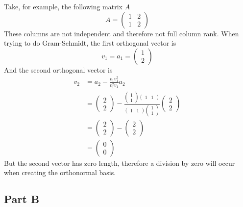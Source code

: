 \documentclass{article}
\begin{document}
Take, for example, the following matrix $A$
$$ A = \begin{pmatrix}
    1 & 2 \\
    1 & 2
\end{pmatrix} $$
These columns are not independent and therefore not full column rank. When
trying to do Gram-Schmidt, the first orthogonal vector is
$$ v_1 = a_1 = \begin{pmatrix} 1 \\ 2 \end{pmatrix} $$
And the second orthogonal vector is
\begin{align*}
    v_2 &= a_2 - \frac{v_1 v_1^2}{v_1^2 v_1} a_2 \\
    &= \begin{pmatrix} 2 \\ 2 \end{pmatrix} - \frac{\begin{pmatrix} 1 \\ 1
    \end{pmatrix} \begin{pmatrix} 1 & 1 \end{pmatrix}}{\begin{pmatrix} 1 & 1
    \end{pmatrix} \begin{pmatrix} 1 \\ 1 \end{pmatrix}} \begin{pmatrix} 2 \\
    2 \end{pmatrix} \\
    &= \begin{pmatrix} 2 \\ 2 \end{pmatrix} - \begin{pmatrix} 2 \\ 2 \end{pmatrix} \\
    &= \begin{pmatrix} 0 \\ 0 \end{pmatrix}
\end{align*}
But the second vector has zero length, therefore a division by zero will
occur when creating the orthonormal basis.

\subsection*{Part B}
\end{document}
